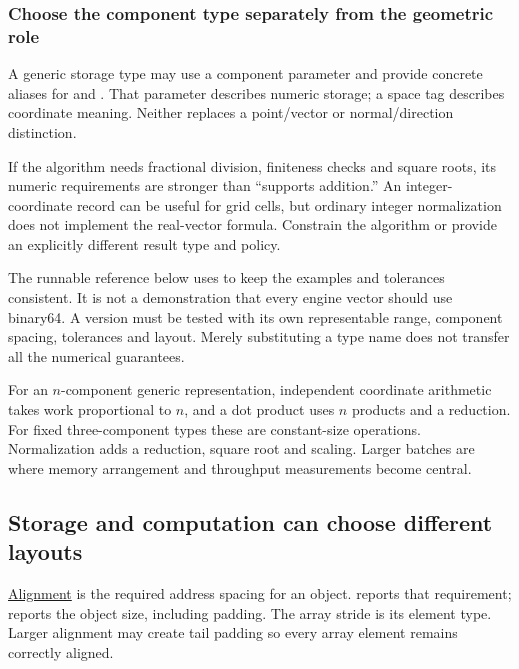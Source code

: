 \subsubsection{Choose the component type separately from the geometric role}\label{02-foundations-ii-ch037-choose-the-component-type-separately-from-the-geometric-role}

\hypertarget{02-foundations-ii-ch037-choose-the-component-type-separately-from-the-geometric-role}{}

A generic storage type may use a component parameter and provide concrete aliases for  and . That parameter describes numeric storage; a space tag describes coordinate meaning. Neither replaces a point/vector or normal/direction distinction.

If the algorithm needs fractional division, finiteness checks and square roots, its numeric requirements are stronger than ``supports addition.'' An integer-coordinate record can be useful for grid cells, but ordinary integer normalization does not implement the real-vector formula. Constrain the algorithm or provide an explicitly different result type and policy.

The runnable reference below uses  to keep the examples and tolerances consistent. It is not a demonstration that every engine vector should use binary64. A  version must be tested with its own representable range, component spacing, tolerances and layout. Merely substituting a type name does not transfer all the numerical guarantees.

For an \(n\)-component generic representation, independent coordinate arithmetic takes work proportional to \(n\), and a dot product uses \(n\) products and a reduction. For fixed three-component types these are constant-size operations. Normalization adds a reduction, square root and scaling. Larger batches are where memory arrangement and throughput measurements become central.

\subsection{Storage and computation can choose different layouts}\label{02-foundations-ii-ch037-storage-and-computation-can-choose-different-layouts}

\hypertarget{02-foundations-ii-ch037-storage-and-computation-can-choose-different-layouts}{}

\hyperref[02-foundations-ii-ch037-storage-and-computation-can-choose-different-layouts]{Alignment} is the required address spacing for an object.  reports that requirement;  reports the object size, including padding. The array stride is  its element type. Larger alignment may create tail padding so every array element remains correctly aligned.

